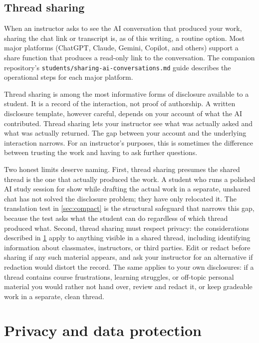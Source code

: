 \documentclass{SIAMbook2023}
\begin{document}
\subsection{Thread sharing}
\label{subsec:thread-sharing}%

When an instructor asks to see the AI conversation that produced your work, sharing the chat link or transcript is, as of this writing, a routine option. Most major platforms (ChatGPT, Claude, Gemini, Copilot, and others) support a share function that produces a read-only link to the conversation. The companion repository's \texttt{students/sharing-ai-conversations.md} guide describes the operational steps for each major platform.

Thread sharing is among the most informative forms of disclosure available to a student. It is a record of the interaction, not proof of authorship. A written disclosure template, however careful, depends on your account of what the AI contributed. Thread sharing lets your instructor see what was actually asked and what was actually returned. The gap between your account and the underlying interaction narrows. For an instructor's purposes, this is sometimes the difference between trusting the work and having to ask further questions.

Two honest limits deserve naming. First, thread sharing presumes the shared thread is the one that actually produced the work. A student who runs a polished AI study session for show while drafting the actual work in a separate, unshared chat has not solved the disclosure problem; they have only relocated it. The translation test in \cref{sec:compact} is the structural safeguard that narrows this gap, because the test asks what the student can do regardless of which thread produced what. Second, thread sharing must respect privacy: the considerations described in \cref{sec:privacy} apply to anything visible in a shared thread, including identifying information about classmates, instructors, or third parties. Edit or redact before sharing if any such material appears, and ask your instructor for an alternative if redaction would distort the record. The same applies to your own disclosures: if a thread contains course frustrations, learning struggles, or off-topic personal material you would rather not hand over, review and redact it, or keep gradeable work in a separate, clean thread.

\section{Privacy and data protection}
\label{sec:privacy}%
\end{document}

